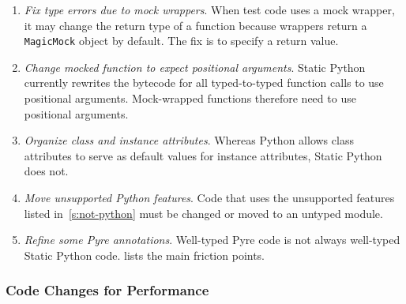 \documentclass[english,cleveref,submission]{programming}
\newcommand{\SP}{Static Python}
\newcommand{\code}[1]{\texttt{#1}}
\newcommand{\ipara}[1]{\emph{#1}\/.}
\begin{document}
\begin{enumerate}
  \item
    \ipara{Fix type errors due to mock wrappers}
    When test code uses a mock wrapper, it may change the
    return type of a function because wrappers return a \code{MagicMock} object
    by default.
    The fix is to specify a return value.

  \item
    \ipara{Change mocked function to expect positional arguments}
    \SP{} currently rewrites the bytecode for all typed-to-typed function calls to use positional arguments.
    Mock-wrapped functions therefore need to use positional arguments.

  \item
    \ipara{Organize class and instance attributes}
    Whereas Python allows class attributes to serve as default values for instance attributes,
    \SP{} does not.

  \item
    \ipara{Move unsupported Python features}
    Code that uses the unsupported features listed in~\cref{s:not-python}
    must be changed or moved to an untyped module.

  \item
    \ipara{Refine some Pyre annotations}
    Well-typed Pyre code is not always well-typed \SP{} code.
     lists the main friction points.

\end{enumerate}


\subsubsection{Code Changes for Performance}
\end{document}
